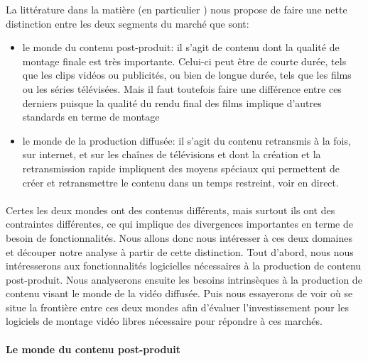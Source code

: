 La littérature dans la matière (en particulier
\cite{WorldVideoNonlinearEditingMarket}) nous propose de faire une nette
distinction entre les deux segments du marché que sont:

\begin{itemize} \setlength{\itemsep}{2mm}

  \item {le monde du contenu post-produit: il s'agit de contenu dont la
    qualité de montage finale est très importante. Celui-ci peut être de
    courte durée, tels que les clips vidéos ou publicités, ou bien de
    longue durée, tels que les films ou les séries télévisées. Mais
    il faut toutefois faire une différence entre ces derniers puisque
    la qualité du rendu final des films implique d'autres standards en
    terme de montage}

  \item {le monde de la production diffusée: il s'agit du contenu
    retransmis à la fois, sur internet, et sur les chaînes de
    télévisions et dont la création et la retransmission rapide
    impliquent des moyens spéciaux qui permettent de créer et
    retransmettre le contenu dans un temps restreint, voir en direct.}

\end{itemize}

\paragraph{}

Certes les deux mondes ont des contenus différents, mais surtout
ils ont des contraintes différentes, ce qui implique des divergences
importantes en terme de besoin de fonctionnalités. Nous allons donc
nous intéresser à ces deux domaines et découper notre analyse à
partir de cette distinction. Tout d'abord, nous nous intéresserons aux
fonctionnalités logicielles nécessaires à la production de contenu
post-produit. Nous analyserons ensuite les besoins intrinsèques à la
production de contenu visant le monde de la vidéo diffusée. Puis nous
essayerons de voir où se situe la frontière entre ces deux mondes afin
d'évaluer l'investissement pour les logiciels de montage vidéo libres
nécessaire pour répondre à ces marchés.

\paragraph{Le monde du contenu post-produit}

\subparagraph{}

